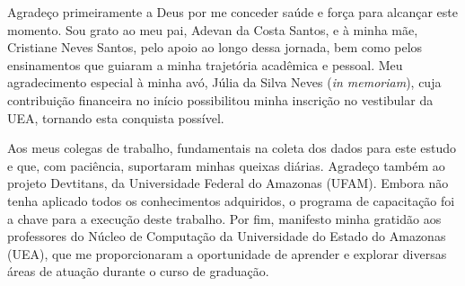 Agradeço primeiramente a Deus por me conceder saúde e força para alcançar este momento. Sou grato ao meu pai, Adevan da Costa Santos, e à minha mãe, Cristiane Neves Santos, pelo apoio ao longo dessa jornada, bem como pelos ensinamentos que 
guiaram a minha trajetória acadêmica e pessoal. Meu agradecimento especial à minha avó, Júlia da Silva Neves (\textit{in memoriam}), cuja contribuição financeira no início possibilitou minha inscrição no vestibular da UEA, tornando esta 
conquista possível.

Aos meus colegas de trabalho, fundamentais na coleta dos dados para este estudo e que, com paciência, suportaram minhas queixas diárias. Agradeço também ao projeto Devtitans, da Universidade Federal do Amazonas (UFAM). Embora não tenha aplicado 
todos os conhecimentos adquiridos, o programa de capacitação foi a chave para a execução deste trabalho. Por fim, manifesto minha gratidão aos professores do Núcleo de Computação da Universidade do Estado do Amazonas (UEA), que me proporcionaram a 
oportunidade de aprender e explorar diversas áreas de atuação durante o curso de graduação.